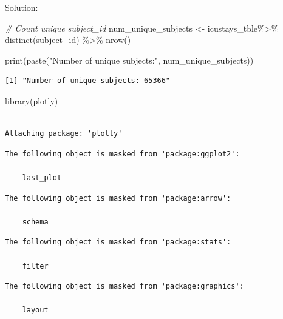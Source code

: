 \documentclass[
]{article}
\newenvironment{Shaded}{\begin{snugshade}}{\end{snugshade}}
\newcommand{\CommentTok}[1]{\textcolor[rgb]{0.56,0.35,0.01}{\textit{#1}}}
\newcommand{\FunctionTok}[1]{\textcolor[rgb]{0.00,0.00,0.00}{#1}}
\newcommand{\NormalTok}[1]{\textcolor[rgb]{0.00,0.00,0.00}{#1}}
\newcommand{\OtherTok}[1]{\textcolor[rgb]{0.56,0.35,0.01}{#1}}
\newcommand{\SpecialCharTok}[1]{\textcolor[rgb]{0.00,0.00,0.00}{#1}}
\newcommand{\StringTok}[1]{\textcolor[rgb]{0.31,0.60,0.02}{#1}}
\begin{document}
Solution:

\begin{Shaded}
\begin{Highlighting}[]
\CommentTok{\# Count unique subject\_id}
\NormalTok{num\_unique\_subjects }\OtherTok{\textless{}{-}}\NormalTok{ icustays\_tble}\SpecialCharTok{\%\textgreater{}\%} 
  \FunctionTok{distinct}\NormalTok{(subject\_id) }\SpecialCharTok{\%\textgreater{}\%} 
  \FunctionTok{nrow}\NormalTok{()}

\FunctionTok{print}\NormalTok{(}\FunctionTok{paste}\NormalTok{(}\StringTok{"Number of unique subjects:"}\NormalTok{, num\_unique\_subjects))}
\end{Highlighting}
\end{Shaded}

\begin{verbatim}
[1] "Number of unique subjects: 65366"
\end{verbatim}

\begin{Shaded}
\begin{Highlighting}[]
\FunctionTok{library}\NormalTok{(plotly)}
\end{Highlighting}
\end{Shaded}

\begin{verbatim}

Attaching package: 'plotly'
\end{verbatim}

\begin{verbatim}
The following object is masked from 'package:ggplot2':

    last_plot
\end{verbatim}

\begin{verbatim}
The following object is masked from 'package:arrow':

    schema
\end{verbatim}

\begin{verbatim}
The following object is masked from 'package:stats':

    filter
\end{verbatim}

\begin{verbatim}
The following object is masked from 'package:graphics':

    layout
\end{verbatim}
\end{document}
